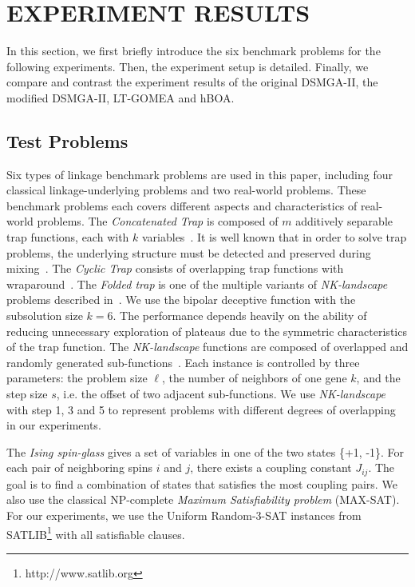 \section{EXPERIMENT RESULTS}
In this section, we first briefly introduce the six benchmark problems for the following experiments. Then, the experiment setup is detailed. Finally, we compare and contrast the experiment results of the original DSMGA-II, the modified DSMGA-II, LT-GOMEA and hBOA. 


\subsection{Test Problems}
Six types of linkage benchmark problems are used in this paper, including four classical linkage-underlying problems and two real-world problems. These benchmark problems each covers different aspects and characteristics of real-world problems. The \textit{Concatenated Trap} is composed of $m$ additively separable trap functions, each with $k$ variables~\cite{deb:sufficient}. It is well known that in order to solve trap problems, the underlying structure must be detected and preserved during mixing~\cite{thierens:mixing}. The \textit{Cyclic Trap} consists of overlapping trap functions with wraparound~\cite{yu:overlapping}. The \textit{Folded trap} is one of the multiple variants of \textit{NK-landscape} problems described in~\cite{goldberg:deception}. We use the bipolar deceptive function with the subsolution size $k = 6$. 
The performance depends heavily on the ability of reducing unnecessary exploration of plateaus due to the symmetric characteristics of the trap function. 
The \textit{NK-landscape} functions are composed of overlapped and randomly generated sub-functions~\cite{pelikan:overlap}. 
Each instance is controlled by three parameters: the problem size $\ell$, the number of neighbors of one gene $k$, and the step size $s$, i.e. the offset of two adjacent sub-functions.
We use \textit{NK-landscape} with step 1, 3 and 5 to represent problems with different degrees of overlapping in our experiments.

The \textit{Ising spin-glass} gives a set of variables in one of the two states \{+1, -1\}.
For each pair of neighboring spins $i$ and $j$, there exists a coupling constant $J_{ij}$.
The goal is to find a combination of states that satisfies the most coupling pairs.
We also use the classical NP-complete \textit{Maximum Satisfiability problem} (MAX-SAT).
For our experiments, we use the Uniform Random-3-SAT instances from SATLIB\footnote{http://www.satlib.org} with all satisfiable clauses.



